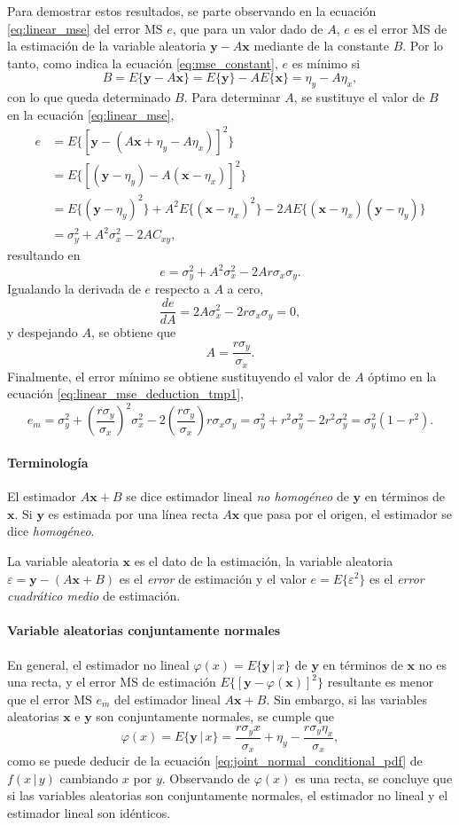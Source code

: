 \documentclass[a4paper]{report}
\newcommand{\x}{\mathbf{x}}
\newcommand{\y}{\mathbf{y}}
\begin{document}
Para demostrar estos resultados, se parte observando en la ecuación \ref{eq:linear_mse} del error MS \(e\), que para un valor dado de \(A\), \(e\) es el error MS de la estimación de la variable aleatoria \(\y-A\x\) mediante de la constante \(B\). Por lo tanto, como indica la ecuación \ref{eq:mse_constant}, \(e\) es mínimo si
\[
 B=E\{\y-A\x\}=E\{\y\}-AE\{\x\}=\eta_y-A\eta_x,
\]
con lo que queda determinado \(B\). Para determinar \(A\), se sustituye el valor de \(B\) en la ecuación \ref{eq:linear_mse},
\begin{align*}
 e&=E\{[\y-(A\x+\eta_y-A\eta_x)]^2\}\\
  &=E\{[(\y-\eta_y)-A(\x-\eta_x)]^2\}\\
  &=E\{(\y-\eta_y)^2\}+A^2E\{(\x-\eta_x)^2\}-2AE\{(\x-\eta_x)(\y-\eta_y)\}\\
  &=\sigma_y^2+A^2\sigma_x^2-2AC_{xy},
\end{align*}
resultando en
\begin{equation}\label{eq:linear_mse_deduction_tmp1}
 e=\sigma_y^2+A^2\sigma_x^2-2Ar\sigma_x\sigma_y.
\end{equation}
Igualando la derivada de \(e\) respecto a \(A\) a cero,
\[
 \frac{de}{dA}=2A\sigma_x^2-2r\sigma_x\sigma_y=0,
\]
y despejando \(A\), se obtiene que
\[
 A=\frac{r\sigma_y}{\sigma_x}.
\]
Finalmente, el error mínimo se obtiene sustituyendo el valor de \(A\) óptimo en la ecuación \ref{eq:linear_mse_deduction_tmp1},
\[
 e_m=\sigma_y^2+\left(\frac{r\sigma_y}{\sigma_x}\right)^2\sigma_x^2-2\left(\frac{r\sigma_y}{\sigma_x}\right)r\sigma_x\sigma_y=\sigma_y^2+r^2\sigma_y^2-2r^2\sigma_y^2
 =\sigma_y^2(1-r^2).
\]

\paragraph{Terminología} El estimador \(A\x+B\) se dice estimador lineal \emph{no homogéneo} de \(\y\) en términos de \(\x\). Si \(\y\) es estimada por una línea recta \(A\x\) que pasa por el origen, el estimador se dice \emph{homogéneo}. 

La variable aleatoria \(\x\) es el dato de la estimación, la variable aleatoria \(\varepsilon=\y-(A\x+B)\) es el \emph{error} de estimación y el valor \(e=E\{\varepsilon^2\}\) es el \emph{error cuadrático medio} de estimación.

\paragraph{Variable aleatorias conjuntamente normales} En general, el estimador no lineal \(\varphi(x)=E\{\y\,|\,x\}\) de \(\y\) en términos de \(\x\) no es una recta, y el error MS de estimación \(E\{[\y-\varphi(\x)]^2\}\) resultante es menor que el error MS \(e_m\) del estimador lineal \(A\x+B\). Sin embargo, si las variables aleatorias \(\x\) e \(\y\) son conjuntamente normales, se cumple que
\[
 \varphi(x)=E\{\y\,|\,x\}=\frac{r\sigma_yx}{\sigma_x}+\eta_y-\frac{r\sigma_y\eta_x}{\sigma_x},
\]
como se puede deducir de la ecuación \ref{eq:joint_normal_conditional_pdf} de \(f(x\,|\,y)\) cambiando \(x\) por \(y\). Observando de \(\varphi(x)\) es una recta, se concluye que si las variables aleatorias son conjuntamente normales, el estimador no lineal y el estimador lineal son idénticos.
\end{document}
